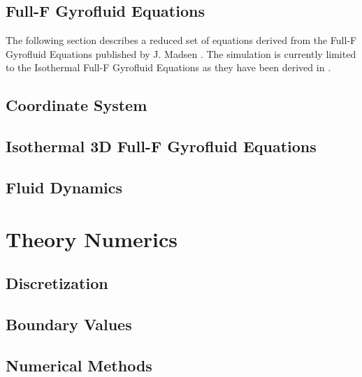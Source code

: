 \documentclass[12pt,oneside,bibtotoc,liststotoc]{scrbook}
\begin{document}
\section{Full-F Gyrofluid Equations}
The following section describes a reduced set of equations derived from the Full-F Gyrofluid Equations published by J. Madsen \cite{doi:10.1063/1.4813241}.
The simulation is currently limited to the Isothermal Full-F Gyrofluid Equations as they have been derived in \cite{HeldDisseration}.

\section{Coordinate System}

\section{Isothermal 3D Full-F Gyrofluid Equations}
\label{sec:isothermalequations}



\section{Fluid Dynamics}
\label{sec:fluid-dynamics}



\chapter{Theory Numerics}
\section{Discretization}

\section{Boundary Values}

\section{Numerical Methods}

\end{document}
